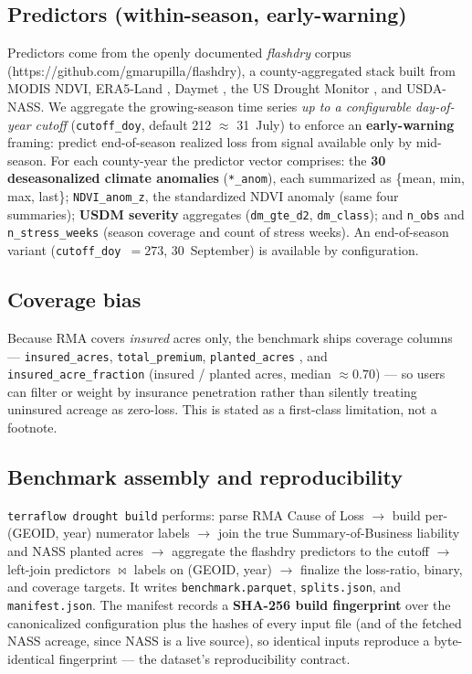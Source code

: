 \documentclass[essd, manuscript]{copernicus}
\begin{document}
\subsection{Predictors (within-season, early-warning)}
\label{sec:predictors}
Predictors come from the openly documented \emph{flashdry} corpus (https://github.com/gmarupilla/flashdry), a county-aggregated stack built from MODIS NDVI, ERA5-Land \citep{munoz2021era5land}, Daymet \citep{thornton2016daymet}, the US Drought Monitor \citep{svoboda2002usdm}, and USDA-NASS. We aggregate the growing-season time series \emph{up to a configurable day-of-year cutoff} (\texttt{cutoff\_doy}, default 212 $\approx$ 31~July) to enforce an \textbf{early-warning} framing: predict end-of-season realized loss from signal available only by mid-season. For each county-year the predictor vector comprises: the \textbf{30 deseasonalized climate anomalies} (\texttt{*\_anom}), each summarized as \{mean, min, max, last\}; \texttt{NDVI\_anom\_z}, the standardized NDVI anomaly (same four summaries); \textbf{USDM severity} aggregates (\texttt{dm\_gte\_d2}, \texttt{dm\_class}); and \texttt{n\_obs} and \texttt{n\_stress\_weeks} (season coverage and count of stress weeks). An end-of-season variant (\texttt{cutoff\_doy}~$= 273$, 30~September) is available by configuration.

\subsection{Coverage bias}
Because RMA covers \emph{insured} acres only, the benchmark ships coverage columns --- \texttt{insured\_acres}, \texttt{total\_premium}, \texttt{planted\_acres} \citep[USDA-NASS,][]{usda_nass_quickstats}, and \texttt{insured\_acre\_fraction} (insured / planted acres, median $\approx 0.70$) --- so users can filter or weight by insurance penetration rather than silently treating uninsured acreage as zero-loss. This is stated as a first-class limitation, not a footnote.

\subsection{Benchmark assembly and reproducibility}
\texttt{terraflow drought build} performs: parse RMA Cause of Loss $\rightarrow$ build per-(GEOID, year) numerator labels $\rightarrow$ join the true Summary-of-Business liability and NASS planted acres $\rightarrow$ aggregate the flashdry predictors to the cutoff $\rightarrow$ left-join predictors $\bowtie$ labels on (GEOID, year) $\rightarrow$ finalize the loss-ratio, binary, and coverage targets. It writes \texttt{benchmark.parquet}, \texttt{splits.json}, and \texttt{manifest.json}. The manifest records a \textbf{SHA-256 build fingerprint} over the canonicalized configuration plus the hashes of every input file (and of the fetched NASS acreage, since NASS is a live source), so identical inputs reproduce a byte-identical fingerprint --- the dataset's reproducibility contract.
\end{document}
